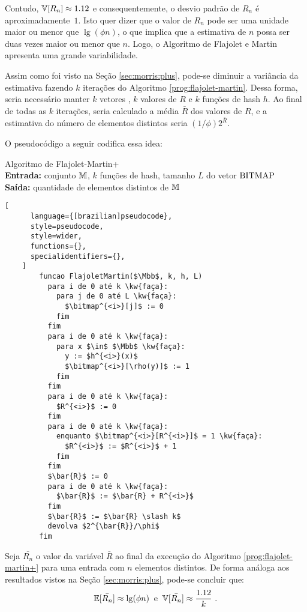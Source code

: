 Contudo, $\Vbb[R_n] \approx\nolinebreak 1.12$ e consequentemente, o desvio padrão de $R_n$ é aproximadamente~$1$. 
Isto quer dizer que o valor de $R_n$ pode ser uma unidade maior ou menor que $\lg(\phi n)$, o que implica que a 
estimativa de $n$ possa ser duas vezes maior ou menor que $n$. Logo, o Algoritmo de Flajolet e Martin apresenta uma 
grande variabilidade.

Assim como foi visto na Seção \ref{sec:morris:plus}, pode-se diminuir a variância da estimativa fazendo $k$ iterações 
do Algoritmo \ref{prog:flajolet-martin}. Dessa forma, seria necessário manter $k$ vetores \bitmap, $k$ valores de $R$ e 
$k$ funções de hash $h$. Ao final de todas as $k$ iterações, seria calculado a média $\bar{R}$ dos valores de $R$, e a 
estimativa do número de elementos distintos seria $(1 \slash \phi) 2^{\bar{R}}$.

O pseudocódigo a seguir codifica essa idea:

\begin{programruledcaption}{
  Algoritmo de Flajolet-Martin+
  \\ \textbf{Entrada:} conjunto $\mathbb{M}$, $k$ funções de hash, tamanho $L$ do vetor $\text{BITMAP}$ 
  \\ \textbf{Saída:} quantidade de elementos distintos de $\mathbb{M}$
  \label{prog:flajolet-martin+}
  }
    \begin{lstlisting}[
      language={[brazilian]pseudocode},
      style=pseudocode,
      style=wider,
      functions={},
      specialidentifiers={},
    ]
        funcao FlajoletMartin($\Mbb$, k, h, L)
          para i de 0 até k \kw{faça}:
            para j de 0 até L \kw{faça}:
              $\bitmap^{<i>}[j]$ := 0
            fim
          fim
          para i de 0 até k \kw{faça}:
            para x $\in$ $\Mbb$ \kw{faça}:
              y := $h^{<i>}(x)$
              $\bitmap^{<i>}[\rho(y)]$ := 1
            fim
          fim
          para i de 0 até k \kw{faça}:
            $R^{<i>}$ := 0
          fim
          para i de 0 até k \kw{faça}:
            enquanto $\bitmap^{<i>}[R^{<i>}]$ = 1 \kw{faça}:
              $R^{<i>}$ := $R^{<i>}$ + 1
            fim
          fim
          $\bar{R}$ := 0
          para i de 0 até k \kw{faça}:
            $\bar{R}$ := $\bar{R} + R^{<i>}$ 
          fim
          $\bar{R}$ := $\bar{R} \slash k$
          devolva $2^{\bar{R}}/\phi$
        fim
    \end{lstlisting}
  \end{programruledcaption}

Seja $\bar{R_n}$ o valor da variável $\bar{R}$ ao final da execução do Algoritmo \ref{prog:flajolet-martin+} para uma
entrada com $n$ elementos distintos. De forma análoga aos resultados vistos na Seção \ref{sec:morris:plus}, pode-se
concluir que:
\[ \Ebb[\bar{R_n}] \approx \lg(\phi n)  \; \; \text{e}  \; \; \Vbb[\bar{R_n}] \approx \frac{1.12}{k} \ . \]


